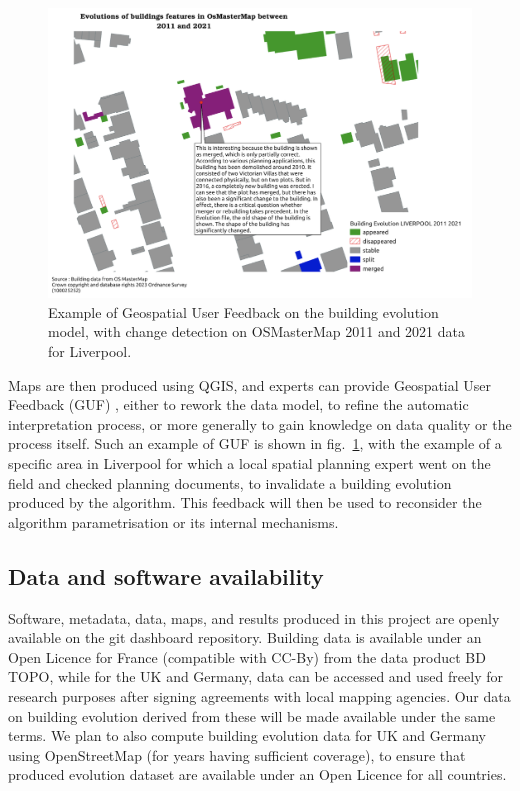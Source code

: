 \documentclass[agile, final]{copernicus-agile}
\begin{document}
\begin{figure}[ht]
  \includegraphics[width=0.8\linewidth]{figures/guf.png}
\caption{Example of Geospatial User Feedback on the building evolution model, with change detection on OSMasterMap 2011 and 2021 data for Liverpool.}
\label{fig:guf} 
\end{figure}

Maps are then produced using QGIS, and experts can provide Geospatial User Feedback (GUF) \citep{zabala2021geospatial}, either to rework the data model, to refine the automatic interpretation process, or more generally to gain knowledge on data quality or the process itself. Such an example of GUF is shown in fig.~\ref{fig:guf}, with the example of a specific area in Liverpool for which a local spatial planning expert went on the field and checked planning documents, to invalidate a building evolution produced by the algorithm. This feedback will then be used to reconsider the algorithm parametrisation or its internal mechanisms.


\subsection{Data and software availability}

Software, metadata, data, maps, and results produced in this project are openly available on the git dashboard repository. Building data is available under an Open Licence for France (compatible with CC-By) from the data product BD TOPO, while for the UK and Germany, data can be accessed and used freely for research purposes after signing agreements with local mapping agencies. Our data on building evolution derived from these will be made available under the same terms. We plan to also compute building evolution data for UK and Germany using OpenStreetMap (for years having sufficient coverage), to ensure that produced evolution dataset are available under an Open Licence for all countries.
\end{document}
